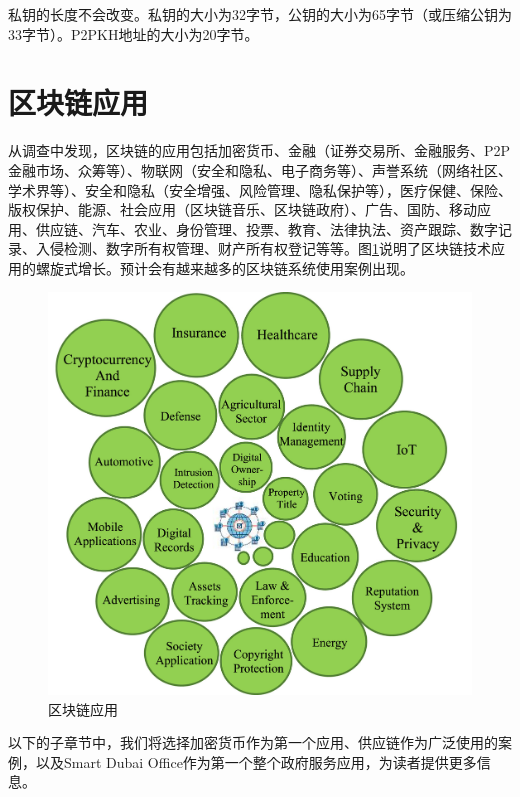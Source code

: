 \begin{translation}
私钥的长度不会改变。私钥的大小为32字节，公钥的大小为65字节（或压缩公钥为33字节）。P2PKH地址的大小为20字节。

\section{区块链应用}

从调查中发现，区块链的应用包括加密货币、金融（证券交易所、金融服务、P2P金融市场、众筹等）、物联网（安全和隐私、电子商务等）、声誉系统（网络社区、学术界等）、安全和隐私（安全增强、风险管理、隐私保护等）\cite{art3}，医疗保健、保险、版权保护、能源、社会应用（区块链音乐、区块链政府）、广告\cite{art43}、国防、移动应用、供应链、汽车\cite{art28}、农业\cite{art44}、身份管理、投票、教育、法律执法、资产跟踪\cite{art45}、数字记录、入侵检测\cite{art46}、数字所有权管理、财产所有权登记等等。图\ref{fig:区块链应用}说明了区块链技术应用的螺旋式增长。预计会有越来越多的区块链系统使用案例出现。

\begin{figure}
	\centering
	\includegraphics[width=\textwidth]{figures/trans5.jpg}
	\caption{区块链应用}
	\label{fig:区块链应用}
\end{figure}

以下的子章节中，我们将选择加密货币作为第一个应用、供应链作为广泛使用的案例，以及Smart Dubai Office作为第一个整个政府服务应用，为读者提供更多信息。


\end{translation}
